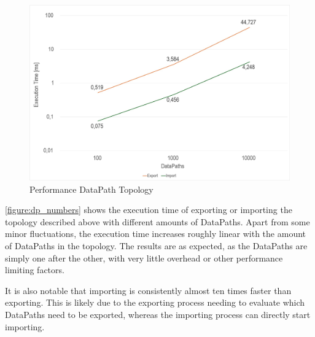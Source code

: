 \begin{figure}[ht]
    \includegraphics[scale=0.29]{images/dp_numbers.jpg} 
    \centering
    \caption{Performance DataPath Topology}
    \label{figure:dp_numbers}
\end{figure}

\autoref{figure:dp_numbers} shows the execution time of exporting or importing the topology described above with different amounts of DataPaths.
Apart from some minor fluctuations, the execution time increases roughly linear with the amount of DataPaths in the topology.
The results are as expected, as the DataPaths are simply one after the other, with very little overhead or other performance limiting factors.

It is also notable that importing is consistently almost ten times faster than exporting.
This is likely due to the exporting process needing to evaluate which DataPaths need to be exported, whereas the importing process can directly start importing.